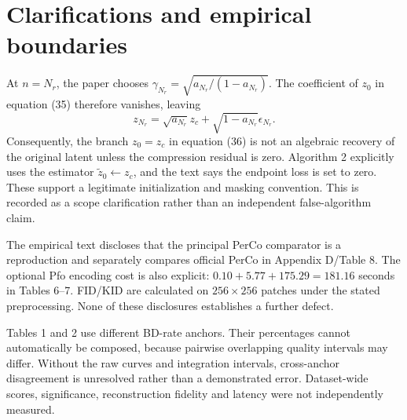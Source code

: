 \documentclass[10pt]{article}
\begin{document}
\section*{Clarifications and empirical boundaries}
At \(n=N_r\), the paper chooses \(\gamma_{N_r}=\sqrt{a_{N_r}/(1-a_{N_r})}\). The coefficient of \(z_0\) in equation (35) therefore vanishes, leaving \[z_{N_r}=\sqrt{a_{N_r}}z_c+
 \sqrt{1-a_{N_r}}\epsilon_{N_r}.\] Consequently, the branch \(z_0=z_c\) in equation (36) is not an algebraic recovery of the original latent unless the compression residual is zero. Algorithm 2 explicitly uses the estimator \(\widetilde z_0\leftarrow z_c\), and the text says the endpoint loss is set to zero. These support a legitimate initialization and masking convention. This is recorded as a scope clarification rather than an independent false-algorithm claim.\par
The empirical text discloses that the principal PerCo comparator is a reproduction and separately compares official PerCo in Appendix D/Table 8. The optional Pfo encoding cost is also explicit: \(0.10+5.77+175.29=181.16\) seconds in Tables 6–7. FID/KID are calculated on \(256\times256\) patches under the stated preprocessing. None of these disclosures establishes a further defect.\par
Tables 1 and 2 use different BD-rate anchors. Their percentages cannot automatically be composed, because pairwise overlapping quality intervals may differ. Without the raw curves and integration intervals, cross-anchor disagreement is unresolved rather than a demonstrated error. Dataset-wide scores, significance, reconstruction fidelity and latency were not independently measured.\par
\end{document}
